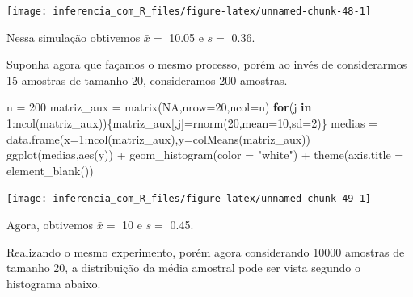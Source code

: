 \documentclass[
]{book}
\newenvironment{Shaded}{\begin{snugshade}}{\end{snugshade}}
\newcommand{\AttributeTok}[1]{\textcolor[rgb]{0.77,0.63,0.00}{#1}}
\newcommand{\ConstantTok}[1]{\textcolor[rgb]{0.00,0.00,0.00}{#1}}
\newcommand{\ControlFlowTok}[1]{\textcolor[rgb]{0.13,0.29,0.53}{\textbf{#1}}}
\newcommand{\DecValTok}[1]{\textcolor[rgb]{0.00,0.00,0.81}{#1}}
\newcommand{\FunctionTok}[1]{\textcolor[rgb]{0.00,0.00,0.00}{#1}}
\newcommand{\NormalTok}[1]{#1}
\newcommand{\OtherTok}[1]{\textcolor[rgb]{0.56,0.35,0.01}{#1}}
\newcommand{\SpecialCharTok}[1]{\textcolor[rgb]{0.00,0.00,0.00}{#1}}
\newcommand{\StringTok}[1]{\textcolor[rgb]{0.31,0.60,0.02}{#1}}
\begin{document}
\begin{center}\texttt{[image: inferencia\_com\_R\_files/figure-latex/unnamed-chunk-48-1]} \end{center}

Nessa simulação obtivemos \(\bar x =\) 10.05 e \(s =\) 0.36.

Suponha agora que façamos o mesmo processo, porém ao invés de considerarmos 15 amostras de tamanho 20, consideramos 200 amostras.

\begin{Shaded}
\begin{Highlighting}[]
\NormalTok{n }\OtherTok{=} \DecValTok{200}
\NormalTok{matriz\_aux }\OtherTok{=} \FunctionTok{matrix}\NormalTok{(}\ConstantTok{NA}\NormalTok{,}\AttributeTok{nrow=}\DecValTok{20}\NormalTok{,}\AttributeTok{ncol=}\NormalTok{n)}
\ControlFlowTok{for}\NormalTok{(j }\ControlFlowTok{in} \DecValTok{1}\SpecialCharTok{:}\FunctionTok{ncol}\NormalTok{(matriz\_aux))\{matriz\_aux[,j]}\OtherTok{=}\FunctionTok{rnorm}\NormalTok{(}\DecValTok{20}\NormalTok{,}\AttributeTok{mean=}\DecValTok{10}\NormalTok{,}\AttributeTok{sd=}\DecValTok{2}\NormalTok{)\}}
\NormalTok{medias }\OtherTok{=} \FunctionTok{data.frame}\NormalTok{(}\AttributeTok{x=}\DecValTok{1}\SpecialCharTok{:}\FunctionTok{ncol}\NormalTok{(matriz\_aux),}\AttributeTok{y=}\FunctionTok{colMeans}\NormalTok{(matriz\_aux))}
\FunctionTok{ggplot}\NormalTok{(medias,}\FunctionTok{aes}\NormalTok{(y)) }\SpecialCharTok{+}
  \FunctionTok{geom\_histogram}\NormalTok{(}\AttributeTok{color =} \StringTok{"white"}\NormalTok{) }\SpecialCharTok{+}
  \FunctionTok{theme}\NormalTok{(}\AttributeTok{axis.title =} \FunctionTok{element\_blank}\NormalTok{())}
\end{Highlighting}
\end{Shaded}

\begin{center}\texttt{[image: inferencia\_com\_R\_files/figure-latex/unnamed-chunk-49-1]} \end{center}

Agora, obtivemos \(\bar x =\) 10 e \(s =\) 0.45.

Realizando o mesmo experimento, porém agora considerando 10000 amostras de tamanho 20, a distribuição da média amostral pode ser vista segundo o histograma abaixo.
\end{document}
